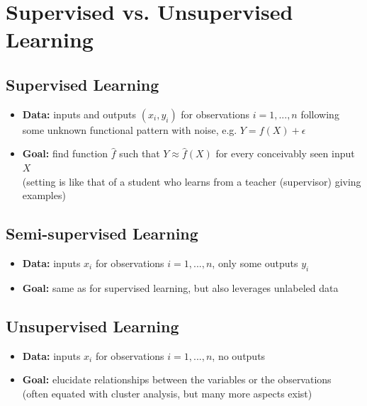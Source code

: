 	\section{Supervised vs. Unsupervised Learning}
		\subsection{Supervised Learning}
			\begin{itemize}
				\item \textbf{Data:} inputs and outputs $(x_i,y_i)$ for observations $i=1,...,n$ following some unknown functional pattern with noise, e.g. $Y=f(X)+\epsilon$
				\item \textbf{Goal:} find function $\hat{f}$ such that $Y \approx \hat{f}(X)$ for every conceivably seen input $X$\\
					(setting is like that of a student who learns from a teacher (supervisor) giving examples)
			\end{itemize}
		
		\subsection{Semi-supervised Learning}
			\begin{itemize}
				\item \textbf{Data:} inputs $x_i$ for observations $i=1,...,n$, only some outputs $y_i$
				\item \textbf{Goal:} same as for supervised learning, but also leverages unlabeled data
			\end{itemize}

		\subsection{Unsupervised Learning}
			\begin{itemize}
				\item \textbf{Data:} inputs $x_i$ for observations $i=1,...,n$, no outputs
				\item \textbf{Goal:} elucidate relationships between the variables or the observations\\
					(often equated with cluster analysis, but many more aspects exist)
			\end{itemize}

